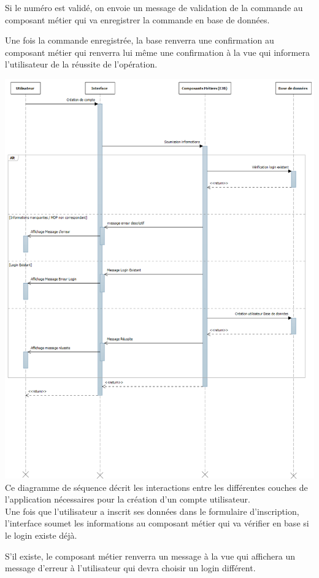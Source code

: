 	Si le numéro est validé, on envoie un message de validation de la commande au composant métier qui va enregistrer la commande en base de données.

	Une fois la commande enregistrée, la base renverra une confirmation au composant métier qui renverra lui même une confirmation à la vue qui informera l'utilisateur de la réussite de l'opération.

	\clearpage
	\includegraphics[scale=0.35]{Res/accountCreationSequence.png}
	Ce diagramme de séquence décrit les interactions entre les différentes couches de l'application nécessaires pour la création d'un compte utilisateur. \\

	Une fois que l'utilisateur a inscrit ses données dans le formulaire d'inscription, l'interface soumet les informations au composant métier qui va vérifier en base si le login existe déjà.

	S'il existe, le composant métier renverra un message à la vue qui affichera un message d'erreur à l'utilisateur qui devra choisir un login différent.

